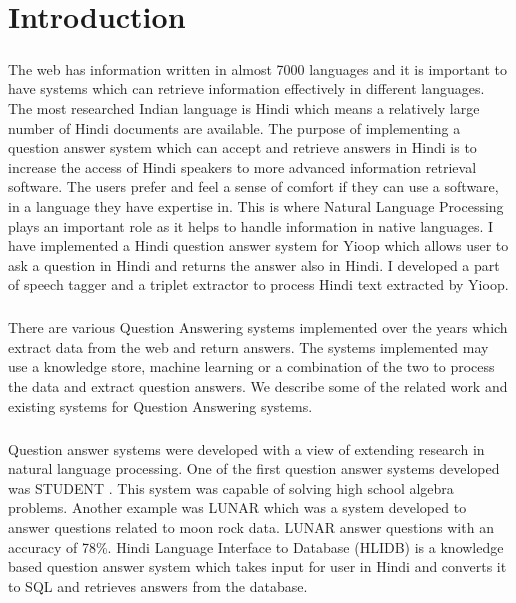 \chapter{Introduction}

\paragraph{}
The web has information written in almost 7000 languages and it is important to
have systems which can retrieve information effectively in different languages. The most researched Indian language is Hindi which means a relatively large number of Hindi documents are available. The purpose of implementing a question answer system which can accept and retrieve answers in Hindi is  to increase the access of Hindi speakers to more advanced information retrieval software. The users prefer and feel a sense of comfort if they can use a software, in a language they have expertise in. This is where Natural Language Processing \cite{chowdhury2003natural} plays an important role as it helps to handle information in native languages. I have implemented  a Hindi question answer system for Yioop which allows user to ask a question in Hindi and returns the answer also in Hindi. I developed a part of speech tagger and a triplet extractor to process Hindi text extracted by Yioop.

\paragraph{}
There are various Question Answering systems implemented over the years which extract data from the web and return answers. The systems implemented may use a knowledge store, machine learning or a combination of the two to process the data and extract question answers. We describe some of the related work and existing systems for Question Answering systems.

\paragraph{}
Question answer systems were developed with a view of extending research in natural language processing. One of the first question answer systems developed was STUDENT \cite{bobrow1964question}. This system was capable of solving high school algebra problems. Another example was LUNAR \cite{voorhees2000building} which was a system developed to answer questions related to moon rock data. LUNAR answer questions with an accuracy of 78\%. Hindi Language Interface to Database (HLIDB) \cite{dua2013hindi} is a knowledge based question answer system which takes input for user in Hindi and converts it to SQL and retrieves answers from the database.

